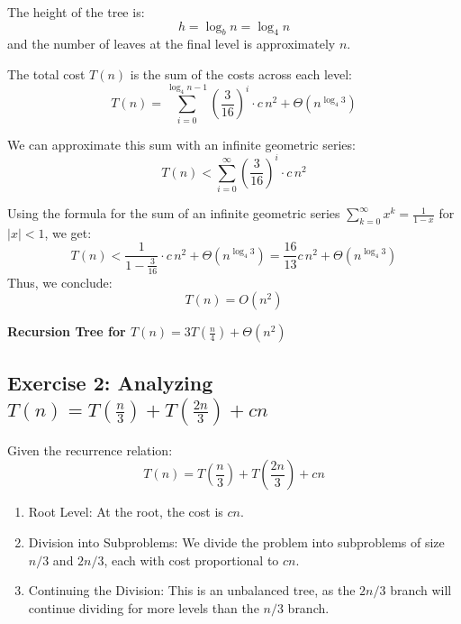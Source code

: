 The height of the tree is:
\[
h = \log_b n = \log_4 n
\]
and the number of leaves at the final level is approximately \(n\).

The total cost \(T(n)\) is the sum of the costs across each level:
\[
T(n) = \sum_{i=0}^{\log_4 n - 1} \left(\frac{3}{16}\right)^i \cdot c \, n^2 + \Theta(n^{\log_4 3})
\]

We can approximate this sum with an infinite geometric series:
\[
T(n) < \sum_{i=0}^{\infty} \left(\frac{3}{16}\right)^i \cdot c \, n^2
\]

Using the formula for the sum of an infinite geometric series \(\sum_{k=0}^{\infty} x^k = \frac{1}{1-x}\) for \(|x| < 1\), we get:
\[
T(n) < \frac{1}{1 - \frac{3}{16}} \cdot c \, n^2 + \Theta(n^{\log_4 3}) = \frac{16}{13} c \, n^2 + \Theta(n^{\log_4 3})
\]
Thus, we conclude:
\[
T(n) = O(n^2)
\]

\begin{center}
    \textbf{Recursion Tree for \(T(n) = 3T\left(\frac{n}{4}\right) + \Theta(n^2)\)}
\end{center}


\subsection{Exercise 2: Analyzing \( T(n) = T\left(\frac{n}{3}\right) + T\left(\frac{2n}{3}\right) + cn \)}

Given the recurrence relation:
\[
T(n) = T\left(\frac{n}{3}\right) + T\left(\frac{2n}{3}\right) + cn
\]
\begin{enumerate}
    \item Root Level: At the root, the cost is \(cn\).
    \item Division into Subproblems: We divide the problem into subproblems of size \(n/3\) and \(2n/3\), each with cost proportional to \(cn\). 
    \item Continuing the Division: This is an unbalanced tree, as the \(2n/3\) branch will continue dividing for more levels than the \(n/3\) branch.
\end{enumerate}

